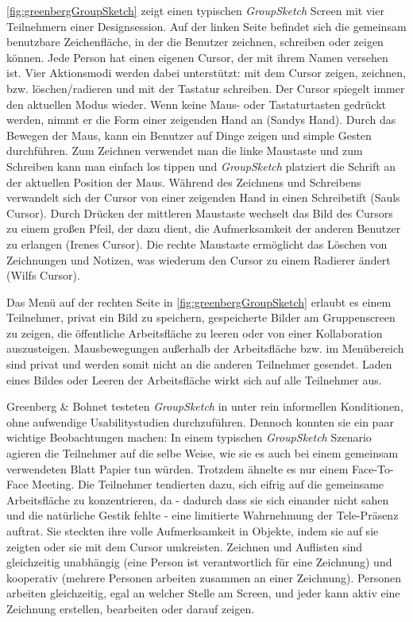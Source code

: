 \autoref{fig:greenbergGroupSketch} zeigt einen typischen \emph{GroupSketch} Screen mit vier Teilnehmern einer Designsession. Auf der linken Seite befindet sich die gemeinsam benutzbare Zeichenfläche, in der die Benutzer zeichnen, schreiben oder zeigen können. Jede Person hat einen eigenen Cursor, der mit ihrem Namen versehen ist. 
Vier Aktionsmodi werden dabei unterstützt: mit dem Cursor zeigen, zeichnen, bzw. löschen/radieren und mit der Tastatur schreiben. Der Cursor spiegelt immer den aktuellen Modus wieder. Wenn keine Maus- oder Tastaturtasten gedrückt werden, nimmt er die Form einer zeigenden Hand an (Sandys Hand). Durch das Bewegen der Maus, kann ein Benutzer auf Dinge zeigen und simple Gesten durchführen. Zum Zeichnen verwendet man die linke Maustaste und zum Schreiben kann man einfach los tippen und \emph{GroupSketch} platziert die Schrift an der aktuellen Position der Maus. Während des Zeichnens und Schreibens verwandelt sich der Cursor von einer zeigenden Hand in einen Schreibstift (Sauls Cursor). Durch Drücken der mittleren Maustaste wechselt das Bild des Cursors zu einem großen Pfeil, der dazu dient, die Aufmerksamkeit der anderen Benutzer zu erlangen (Irenes Cursor). Die rechte Maustaste ermöglicht das Löschen von Zeichnungen und Notizen, was wiederum den Cursor zu einem Radierer ändert (Wilfs Cursor).

\medskip Das Menü auf der rechten Seite in \autoref{fig:greenbergGroupSketch} erlaubt es einem Teilnehmer, privat ein Bild zu speichern, gespeicherte Bilder am Gruppenscreen zu zeigen, die öffentliche Arbeitsfläche zu leeren oder von einer Kollaboration auszusteigen. Mausbewegungen außerhalb der Arbeitsfläche bzw. im Menübereich sind privat und werden somit nicht an die anderen Teilnehmer gesendet. Laden eines Bildes oder Leeren der Arbeitsfläche wirkt sich auf alle Teilnehmer aus.

\medskip Greenberg \& Bohnet testeten \emph{GroupSketch} in \citep{Greenberg:1991} unter rein informellen Konditionen, ohne aufwendige Usabilitystudien durchzuführen. Dennoch konnten sie ein paar wichtige Beobachtungen machen: In einem typischen \emph{GroupSketch} Szenario agieren die Teilnehmer auf die selbe Weise, wie sie es auch bei einem gemeinsam verwendeten Blatt Papier tun würden. Trotzdem ähnelte es nur einem Face-To-Face Meeting. Die Teilnehmer tendierten dazu, sich eifrig auf die gemeinsame Arbeitsfläche zu konzentrieren, da - dadurch dass sie sich einander nicht sahen und die natürliche Gestik fehlte - eine limitierte Wahrnehmung der Tele-Präsenz auftrat. Sie steckten ihre volle Aufmerksamkeit in Objekte, indem sie auf sie zeigten oder sie mit dem Cursor umkreisten. 
Zeichnen und Auflisten sind gleichzeitig unabhängig (eine Person ist verantwortlich für eine Zeichnung) und kooperativ (mehrere Personen arbeiten zusammen an einer Zeichnung). Personen arbeiten gleichzeitig, egal an welcher Stelle am Screen, und jeder kann aktiv eine Zeichnung erstellen, bearbeiten oder darauf zeigen. 

